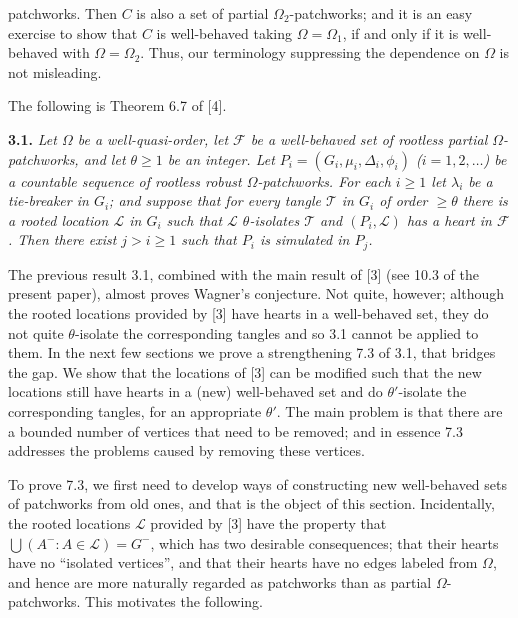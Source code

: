 \noindent patchworks. Then $C$ is also a set of partial $\Omega_2$-patchworks; and it is an easy exercise to show that $C$ is well-behaved taking $\Omega = \Omega_1$, if and only if it is well-behaved with $\Omega = \Omega_2$. Thus, our terminology suppressing the dependence on $\Omega$ is not misleading.

The following is Theorem 6.7 of [4].

\textbf{3.1.} \textit{Let $\Omega$ be a well-quasi-order, let $\mathcal{F}$ be a well-behaved set of rootless partial $\Omega$-patchworks, and let $\theta \ge 1$ be an integer. Let $P_i = (G_i, \mu_i, \Delta_i, \phi_i)$ ($i = 1, 2, \dots$) be a countable sequence of rootless robust $\Omega$-patchworks. For each $i \ge 1$ let $\lambda_i$ be a tie-breaker in $G_i$; and suppose that for every tangle $\mathcal{T}$ in $G_i$ of order $\ge \theta$ there is a rooted location $\mathcal{L}$ in $G_i$ such that $\mathcal{L}$ $\theta$-isolates $\mathcal{T}$ and $(P_i, \mathcal{L})$ has a heart in $\mathcal{F}$. Then there exist $j > i \ge 1$ such that $P_i$ is simulated in $P_j$.}


The previous result 3.1, combined with the main result of [3] (see 10.3 of the present paper), almost proves Wagner's conjecture. Not quite, however; although the rooted locations provided by [3] have hearts in a well-behaved set, they do not quite $\theta$-isolate the corresponding tangles and so 3.1 cannot be applied to them. In the next few sections we prove a strengthening 7.3 of 3.1, that bridges the gap. We show that the locations of [3] can be modified such that the new locations still have hearts in a (new) well-behaved set and do $\theta'$-isolate the corresponding tangles, for an appropriate $\theta'$. The main problem is that there are a bounded number of vertices that need to be removed; and in essence 7.3 addresses the problems caused by removing these vertices.

To prove 7.3, we first need to develop ways of constructing new well-behaved sets of patchworks from old ones, and that is the object of this section. Incidentally, the rooted locations $\mathcal{L}$ provided by [3] have the property that $\bigcup(A^- : A \in \mathcal{L}) = G^-$, which has two desirable consequences; that their hearts have no ``isolated vertices'', and that their hearts have no edges labeled from $\Omega$, and hence are more naturally regarded as patchworks than as partial $\Omega$-patchworks. This motivates the following.


